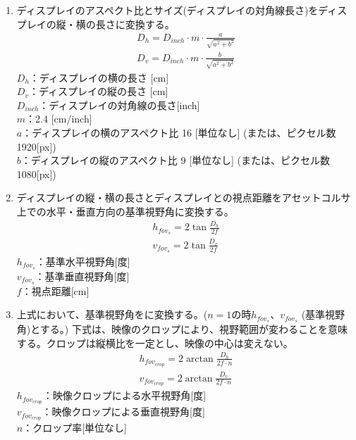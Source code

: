 \begin{enumerate}
  \item ディスプレイのアスペクト比とサイズ(ディスプレイの対角線長さ)をディスプレイの縦・横の長さに変換する。
  \begin{align}
    D_h = D_{inch}\cdot m \cdot \frac{a}{\sqrt{a^2+b^2}}\\
    D_v = D_{inch}\cdot m \cdot \frac{b}{\sqrt{a^2+b^2}}
  \end{align}
  $D_h$：ディスプレイの横の長さ [cm]\\
  $D_v$：ディスプレイの縦の長さ [cm]\\
  $D_{inch}$：ディスプレイの対角線の長さ[inch]\\
  $m$：2.4 [cm/inch]\\
  $a$：ディスプレイの横のアスペクト比 16 [単位なし] (または、ピクセル数 1920[px])\\
  $b$：ディスプレイの縦のアスペクト比 9 [単位なし] (または、ピクセル数 1080[px])
  \item ディスプレイの縦・横の長さとディスプレイとの視点距離をアセットコルサ上での水平・垂直方向の基準視野角に変換する。
  \begin{align}
    h_{fov_s} = 2\tan{\frac{D_h}{2f}}\\
    v_{fov_s} = 2\tan{\frac{D_v}{2f}}
  \end{align}
  $h_{fov_s}$：基準水平視野角[度]\\
  $v_{fov_s}$：基準垂直視野角[度]\\
  $f$：視点距離[cm]
  
  \item 上式において、基準視野角をに変換する。($n = 1$の時$h_{fov_s}$、$v_{fov_s}$ (基準視野角)とする。) 
  下式は、映像のクロップにより、視野範囲が変わることを意味する。クロップは縦横比を一定とし、映像の中心は変えない。
  \begin{align}
    h_{fov_{crop}} = 2\arctan{\frac{D_h}{2f\cdot n}}\\
    v_{fov_{crop}} = 2\arctan{\frac{D_v}{2f\cdot n}}
  \end{align}
  $h_{fov_{crop}}$：映像クロップによる水平視野角[度]\\
  $v_{fov_{crop}}$：映像クロップによる垂直視野角[度]\\
  $n$：クロップ率[単位なし]


\end{enumerate}
